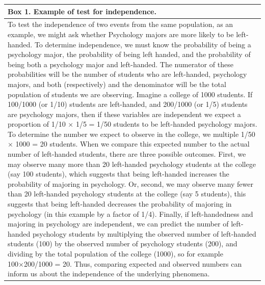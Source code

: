 \documentclass[
  english,
  ,man,floatsintext]{apa6}
\begin{document}
\newpage
\begingroup\fontsize{9}{11}\selectfont

\begin{longtable}{>{\raggedright\arraybackslash}p{450px}}
\toprule
Box 1. Example of test for independence.\\
\midrule
To test the independence of two events from the same population, as an example, we might ask whether Psychology majors are more likely to be left-handed. To determine independence, we must know the probability of being a psychology major, the probability of being left handed, and the probability of being both a psychology major and left-handed. The numerator of these probabilities will be the number of students who are left-handed, psychology majors, and both (respectively) and the denominator will be the total population of students we are observing. Imagine a college of 1000 students. If 100/1000 (or 1/10) students are left-handed, and 200/1000 (or 1/5) students are psychology majors, then if these variables are independent we expect a proportion of 1/10 × 1/5 = 1/50 students to be left-handed psychology majors. To determine the number we expect to observe in the college, we multiple 1/50 × 1000 = 20 students. When we compare this expected number to the actual number of left-handed students, there are three possible outcomes. First, we may observe many more than 20 left-handed psychology students at the college (say 100 students), which suggests that being left-handed increases the probability of majoring in psychology. Or, second, we may observe many fewer than 20 left-handed psychology students at the college (say 5 students), this suggests that being left-handed decreases the probability of majoring in psychology (in this example by a factor of 1/4). Finally, if left-handedness and majoring in psychology are independent, we can predict the number of left-handed psychology students by multiplying the observed number of left-handed students (100) by the observed number of psychology students (200), and dividing by the total population of the college (1000), so for example 100×200/1000 = 20. Thus, comparing expected and observed numbers can inform us about the independence of the underlying phenomena.\\
\bottomrule
\end{longtable}
\endgroup{}
\end{document}
